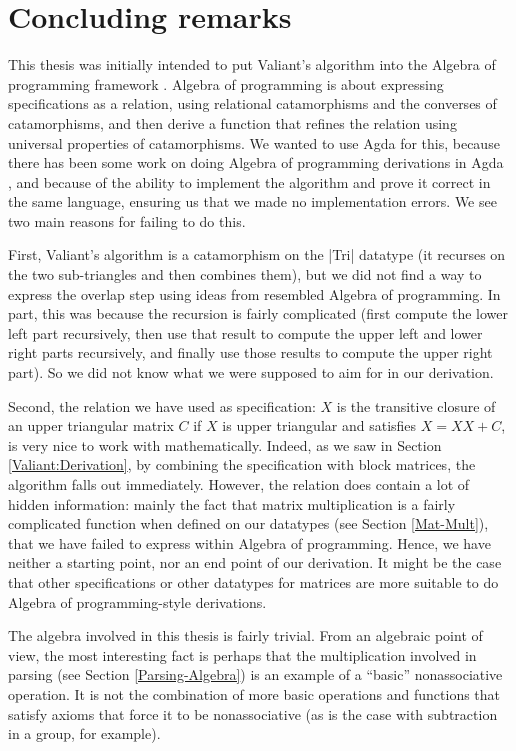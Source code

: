\chapter{Concluding remarks}
This thesis was initially intended to put Valiant's algorithm into the Algebra of programming framework \citep{AoP}. Algebra of programming is about expressing specifications as a relation, using relational catamorphisms and the converses of catamorphisms, and then derive a function that refines the relation using universal properties of catamorphisms. We wanted to use Agda for this, because there has been some work on doing Algebra of programming derivations in Agda \citep{AoPA}, and because of the ability to implement the algorithm and prove it correct in the same language, ensuring us that we made no implementation errors. We see two main reasons for failing to do this.

First, 
Valiant's algorithm is a catamorphism on the |Tri| datatype (it recurses on the two sub-triangles and then combines them), but we did not find a way to express the overlap step using ideas from resembled Algebra of programming. In part, this was because the recursion is fairly complicated (first compute the lower left part recursively, then use that result to compute the upper left and lower right parts recursively, and finally use those results to compute the upper right part). So we did not know what we were supposed to aim for in our derivation.

Second, the relation we have used as specification: $X$ is the transitive closure of an upper triangular matrix $C$ if $X$ is upper triangular and satisfies $X = XX + C$, is very nice to work with mathematically. Indeed, as we saw in Section \ref{Valiant:Derivation}, by combining the specification with block matrices, the algorithm falls out immediately. However, the relation does contain a lot of hidden information: mainly the fact that  matrix multiplication is a fairly complicated function when defined on our datatypes (see Section \ref{Mat-Mult}), that we have failed to express within Algebra of programming. Hence, we have neither a starting point, nor an end point of our derivation. It might be the case that other specifications or other datatypes for matrices are more suitable to do Algebra of programming-style derivations.

The algebra involved in this thesis is fairly trivial. From an algebraic point of view, the most interesting fact is perhaps that the multiplication involved in parsing (see Section \ref{Parsing-Algebra}) is an example of a ``basic'' nonassociative operation. It is not the combination of more basic operations and functions that satisfy axioms that force it to be nonassociative (as is the case with subtraction in a group, for example).

